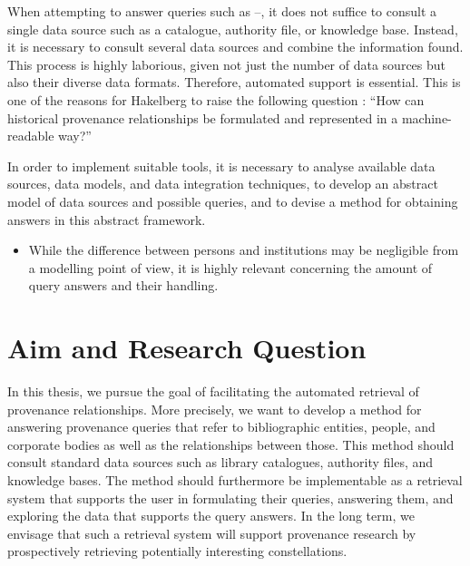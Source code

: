 When attempting to answer queries such as --,
it does not suffice to consult a single data source such as
a catalogue, authority file, or knowledge base.
Instead, it is necessary to consult several data sources
and combine the information found. This process is highly laborious,
given not just the number of data sources but also their diverse
data formats. Therefore, automated support is essential.
This is one of the reasons for Hakelberg
to raise the following question \autocite[p.\,46, translated from German]{Hakelberg2016}:
\enquote{How can historical provenance relationships be formulated and represented
in a machine-readable way?}

In order to implement suitable tools,
it is necessary to analyse available data sources, data models, and data integration techniques,
to develop an abstract model of data sources and possible queries,
and to devise a method for obtaining answers in this abstract framework.

%
\begin{itemize}
  \item
    While the difference between persons and institutions may be negligible
    from a modelling point of view, it is highly relevant concerning the
    amount of query answers and their handling.
\end{itemize}

\section{Aim and Research Question}
\label{sec:research_questions}

In this thesis, we pursue the goal of facilitating
the automated retrieval of provenance relationships.
More precisely,
we want to develop a method for answering provenance queries that refer to bibliographic entities, people, and corporate bodies
as well as the relationships between those. This method should consult standard data sources such as
library catalogues, authority files, and knowledge bases. The method should furthermore be implementable as a retrieval system
that supports the user in formulating their queries, answering them, and exploring the data that supports the query answers.
In the long term, we envisage that such a retrieval system will support provenance research
by prospectively retrieving potentially interesting constellations.

